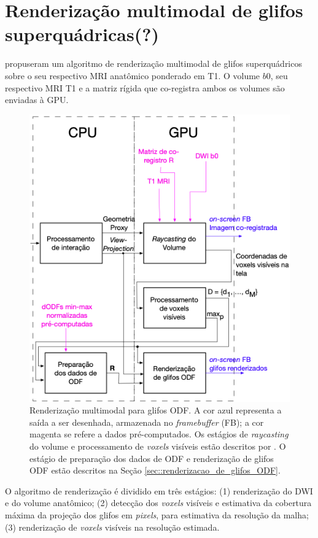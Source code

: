 \section{Renderização multimodal de glifos superquádricas(?)}
\label{sec::superquadricas}


 propuseram um algoritmo de renderização multimodal de glifos superquádricos sobre o seu respectivo MRI anatômico ponderado em T1. O volume $b0$, seu respectivo MRI T1 e a matriz rígida que co-registra ambos os volumes \cite{ting2014} são enviadas à GPU.

\begin{figure}[ht]
    \centering
    \includegraphics[width=.7\linewidth, angle=0]{figs/Esquema_Glifo/fluxograma_glifos_VMTK.png}
    \caption{
    Renderização multimodal para glifos ODF. A cor azul representa a saída a ser desenhada, armazenada no \textit{framebuffer} (FB); a cor magenta se refere a dados pré-computados. Os estágios de \textit{raycasting} do volume e processamento de \textit{voxels} visíveis estão descritos por . O estágio de preparação dos dados de ODF e renderização de glifos ODF estão descritos na Seção \ref{sec::renderizacao_de_glifos_ODF}.
    }
    \label{fig::vmtk_simplified}
\end{figure}

O algoritmo de renderização é dividido em três estágios: (1) renderização do DWI e do volume anatômico; (2) detecção dos \textit{voxels} visíveis e estimativa da cobertura máxima da projeção dos glifos em \textit{pixels}, para estimativa da resolução da malha; (3) renderização de \textit{voxels} visíveis na resolução estimada.

